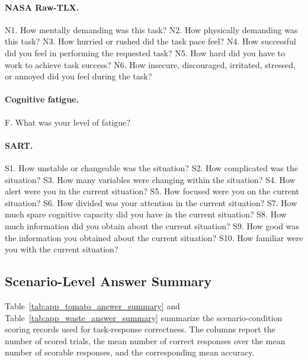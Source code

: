 \paragraph{NASA Raw-TLX.}
N1. How mentally demanding was this task?
N2. How physically demanding was this task?
N3. How hurried or rushed did the task pace feel?
N4. How successful did you feel in performing the requested task?
N5. How hard did you have to work to achieve task success?
N6. How insecure, discouraged, irritated, stressed, or annoyed did you feel during the task?

\paragraph{Cognitive fatigue.}
F. What was your level of fatigue?

\paragraph{SART.}
S1. How unstable or changeable was the situation?
S2. How complicated was the situation?
S3. How many variables were changing within the situation?
S4. How alert were you in the current situation?
S5. How focused were you on the current situation?
S6. How divided was your attention in the current situation?
S7. How much spare cognitive capacity did you have in the current situation?
S8. How much information did you obtain about the current situation?
S9. How good was the information you obtained about the current situation?
S10. How familiar were you with the current situation?

\subsection{Scenario-Level Answer Summary}

Table~\ref{tab:app_tomato_answer_summary} and Table~\ref{tab:app_waste_answer_summary} summarize the scenario-condition scoring records used for task-response correctness. The columns report the number of scored trials, the mean number of correct responses over the mean number of scorable responses, and the corresponding mean accuracy.


